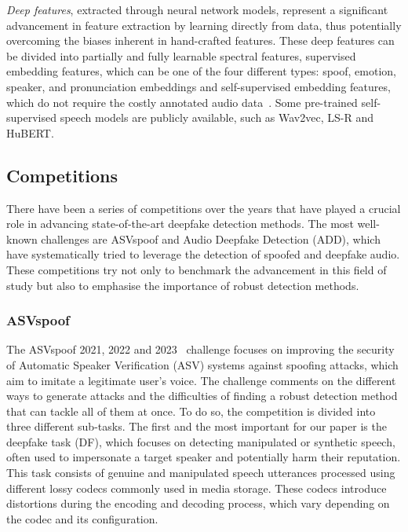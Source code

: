 \documentclass{Interspeech}
\begin{document}
\textit{Deep features}, extracted through neural network models, represent a significant advancement in feature extraction by learning directly from data, thus potentially overcoming the biases inherent in hand-crafted features. These deep features can be divided into partially and fully learnable spectral features, supervised embedding features, which can be one of the four different types: spoof, emotion, speaker, and pronunciation embeddings and self-supervised embedding features, which do not require the costly annotated audio data~\cite{yu2017dnn}. Some pre-trained self-supervised speech models are publicly available, such as Wav2vec, LS-R and HuBERT.

\subsection{Competitions}
There have been a series of competitions over the years that have played a
crucial role in advancing state-of-the-art deepfake detection methods. The most
well-known challenges are ASVspoof and Audio Deepfake Detection (ADD), which
have systematically tried to leverage the detection of spoofed and deepfake
audio. These competitions try not only to benchmark the advancement in this
field of study but also to emphasise the importance of robust detection
methods.

\subsubsection{ASVspoof} The ASVspoof 2021, 2022 and 2023~\cite{ASVspoof_21, jung2022sasv, ge2023can}
challenge focuses on improving the security of Automatic Speaker Verification
(ASV) systems against spoofing attacks, which aim to imitate a legitimate
user's voice. The challenge comments on the different ways to generate attacks
and the difficulties of finding a robust detection method that can tackle all
of them at once. To do so, the competition is divided into three different
sub-tasks. The first and the most important for our paper is the deepfake task
(DF), which focuses on detecting manipulated or synthetic speech, often used to
impersonate a target speaker and potentially harm their reputation.
This task consists of genuine and manipulated speech utterances processed using
different lossy codecs commonly used in media storage. These codecs introduce
distortions during the encoding and decoding process, which vary depending on
the codec and its configuration.
\end{document}
